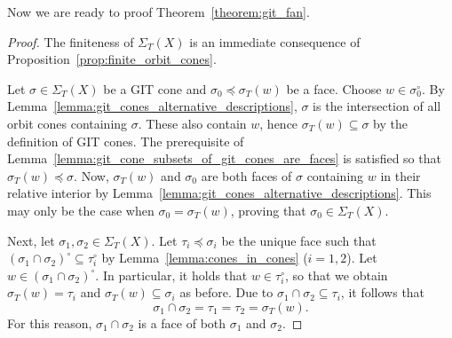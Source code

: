 Now we are ready to proof Theorem~\ref{theorem:git_fan}.
\begin{proof}
	The finiteness of $\Sigma_T(X)$ is an immediate consequence of Proposition~\ref{prop:finite_orbit_cones}. 
	
	Let $\sigma\in\Sigma_T(X)$ be a GIT cone and $\sigma_0\preceq\sigma_T(w)$ be a face. Choose $w\in\sigma_0^\circ$. By Lemma~\ref{lemma:git_cones_alternative_descriptions}, $\sigma$ is the intersection of all orbit cones containing $\sigma$. These also contain $w$, hence $\sigma_T(w)\subseteq \sigma$ by the definition of GIT cones. The prerequisite of Lemma~\ref{lemma:git_cone_subsets_of_git_cones_are_faces} is satisfied so that $\sigma_T(w)\preceq \sigma$. Now, $\sigma_T(w)$ and $\sigma_0$ are both faces of $\sigma$ containing $w$ in their relative interior by Lemma~\ref{lemma:git_cones_alternative_descriptions}. This may only be the case when $\sigma_0 = \sigma_T(w)$, proving that $\sigma_0\in\Sigma_T(X)$.
	
	Next, let $\sigma_1,\sigma_2\in\Sigma_T(X)$. Let $\tau_i\preceq\sigma_i$ be the unique face such that $(\sigma_1\cap\sigma_2)^\circ \subseteq \tau_i^\circ$ by Lemma~\ref{lemma:cones_in_cones} ($i=1,2$). Let $w\in(\sigma_1\cap\sigma_2)^\circ$. In particular, it holds that $w\in\tau_i^\circ$, so that we obtain $\sigma_T(w) = \tau_i$ and $\sigma_T(w)\subseteq \sigma_i$ as before. Due to $\sigma_1 \cap \sigma_2 \subseteq \tau_i$, it follows that 
	$$\sigma_1 \cap \sigma_2 = \tau_1 = \tau_2 = \sigma_T(w).$$
	For this reason, $\sigma_1 \cap \sigma_2$ is a face of both $\sigma_1$ and $\sigma_2$.
\end{proof}